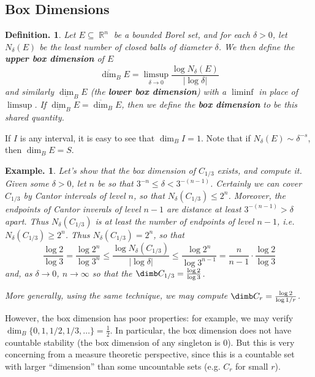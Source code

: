\documentclass[11pt, a4paper]{memoir}
\DeclareMathOperator{\R}{{\mathbb{R}}}
\theoremstyle{change}
\theoremstyle{plain}
\theoremstyle{nonumberplain}
\newtheorem{definition}{Definition.}
\newtheorem{example}{Example.}
\newcommand{\defn}[1]{{\boldmath\bfseries #1}}
\newcommand{\bdim}{\ensuremath{\dim_B}}
\newcommand{\ubdim}{\ensuremath{\overline{\dim}_B}}
\newcommand{\lbdim}{\ensuremath{\underline{\dim}_B}}
\numberwithin{equation}{section}
\begin{document}
\subsection{Box Dimensions}
\begin{definition}
    Let $E\subseteq\R^n$ be a bounded Borel set, and for each $\delta>0$, let $N_\delta(E)$ be the least number of closed balls of diameter $\delta$.
    We then define the \defn{upper box dimension} of $E$
    \begin{equation*}
        \ubdim E=\limsup_{\delta\to 0}\frac{\log N_\delta(E)}{|\log\delta|}
    \end{equation*}
    and similarly $\lbdim E$ (the \defn{lower box dimension}) with a $\liminf$ in place of $\limsup$.
    If $\lbdim E=\ubdim E$, then we define the \defn{box dimension} to be this shared quantity.
\end{definition}
If $I$ is any interval, it is easy to see that $\bdim I=1$.
Note that if $N_\delta(E)\sim\delta^{-s}$, then $\bdim E=S$.
\begin{example}
    Let's show that the box dimension of $C_{1/3}$ exists, and compute it.
    Given some $\delta>0$, let $n$ be so that $3^{-n}\leq\delta<3^{-(n-1)}$.
    Certainly we can cover $C_{1/3}$ by Cantor intervals of level $n$, so that $N_\delta(C_{1/3})\leq 2^n$.
    Moreover, the endpoints of Cantor inverals of level $n-1$ are distance at least $3^{-(n-1)}>\delta$ apart.
    Thus $N_\delta(C_{1/3})$ is at least the number of endpoints of level $n-1$, i.e. $N_\delta(C_{1/3})\geq 2^n$.
    Thus $N_\delta(C_{1/3})=2^n$, so that
    \begin{equation*}
        \frac{\log 2}{\log 3}=\frac{\log 2^n}{\log 3^n}\leq\frac{\log N_\delta(C_{1/3})}{|\log\delta|}\leq\frac{\log 2^n}{\log 3^{n-1}}=\frac{n}{n-1}\cdot\frac{\log 2}{\log 3}
    \end{equation*}
    and, as $\delta\to 0$, $n\to\infty$ so that the $\dimb C_{1/3}=\frac{\log 2}{\log 3}$.

    More generally, using the same technique, we may compute $\dimb C_r=\frac{\log 2}{\log 1/r}$.
\end{example}
However, the box dimension has poor properties: for example, we may verify $\bdim\{0,1,1/2,1/3,\ldots\}=\frac{1}{2}$.
In particular, the box dimension does not have countable stability (the box dimension of any singleton is 0).
But this is very concerning from a measure theoretic perspective, since this is a countable set with larger ``dimension'' than some uncountable sets (e.g. $C_r$ for small $r$).
\end{document}

